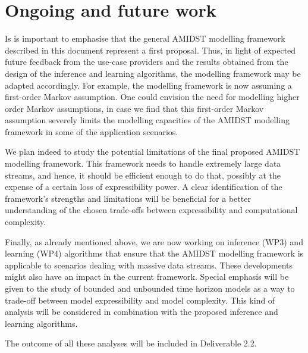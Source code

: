 \section{Ongoing and future work}\label{section:conclusions}

Is is important to emphasise that the general AMIDST modelling framework described in this document represent a first proposal. Thus, in light of expected future feedback from the use-case providers and the results obtained from the design of the inference and learning algorithms, the modelling framework may be adapted accordingly. For example, the modelling framework is now assuming a first-order Markov assumption. One could envision the need for modelling higher order Markov assumptions, in case we find that this first-order Markov assumption severely limits the modelling capacities of the AMIDST modelling framework in some of the application scenarios. 

We plan indeed to study the potential limitations of the final proposed AMIDST modelling framework. This framework needs to handle extremely large data streams, and hence, it should be efficient enough to do that, possibly at the expense of a certain loss of expressibility power. A clear identification of the framework's strengths and limitations will be beneficial for a better understanding of the chosen trade-offs between expressibility and computational complexity.

Finally, as already mentioned above,  we are now working on inference (WP3) and learning (WP4) algorithms that ensure that the AMIDST modelling framework is applicable to scenarios dealing with massive data streams. These developments might also have an impact in the current framework. Special emphasis will be given to the study of bounded and unbounded time horizon models as a way to trade-off between model expressibility and model complexity. This kind of analysis will be considered in combination with the proposed inference and learning algorithms.

The outcome of all these analyses will be included in Deliverable 2.2.
